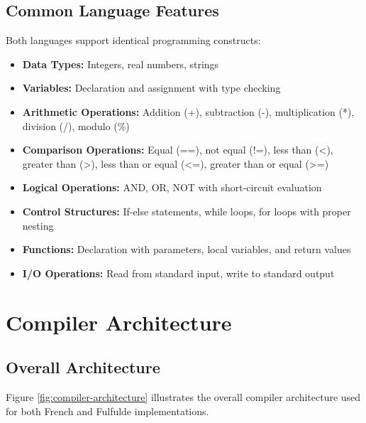 \documentclass[12pt,a4paper]{article}
\begin{document}
\subsection{Common Language Features}

Both languages support identical programming constructs:

\begin{itemize}
    \item \textbf{Data Types:} Integers, real numbers, strings
    \item \textbf{Variables:} Declaration and assignment with type checking
    \item \textbf{Arithmetic Operations:} Addition (+), subtraction (-), multiplication (*), division (/), modulo (\%)
    \item \textbf{Comparison Operations:} Equal (==), not equal (!=), less than (<), greater than (>), less than or equal (<=), greater than or equal (>=)
    \item \textbf{Logical Operations:} AND, OR, NOT with short-circuit evaluation
    \item \textbf{Control Structures:} If-else statements, while loops, for loops with proper nesting
    \item \textbf{Functions:} Declaration with parameters, local variables, and return values
    \item \textbf{I/O Operations:} Read from standard input, write to standard output
\end{itemize}

\section{Compiler Architecture}

\subsection{Overall Architecture}

Figure \ref{fig:compiler-architecture} illustrates the overall compiler architecture used for both French and Fulfulde implementations.
\end{document}
